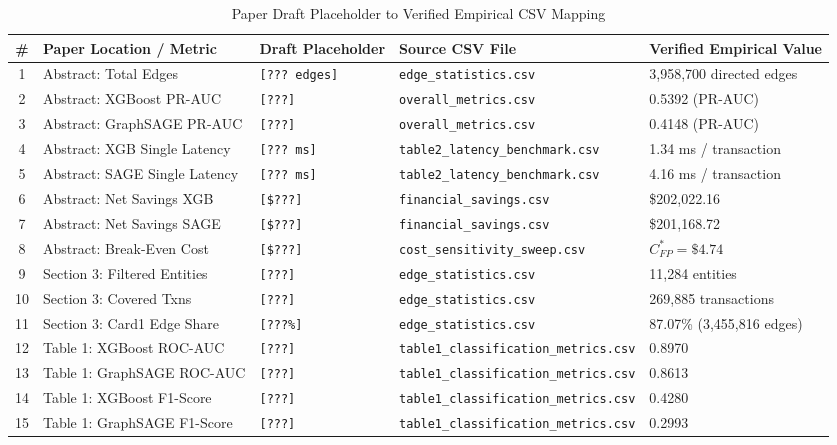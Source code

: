 \documentclass[11pt,a4paper]{report}
\begin{document}
\begin{table}[H]
\centering
\caption{Paper Draft Placeholder to Verified Empirical CSV Mapping}
\label{tab:placeholder_mapping}
\small
\begin{tabular}{cllll}
\toprule
\textbf{\#} & \textbf{Paper Location / Metric} & \textbf{Draft Placeholder} & \textbf{Source CSV File} & \textbf{Verified Empirical Value} \\
\midrule
1 & Abstract: Total Edges & \texttt{[??? edges]} & \texttt{edge\_statistics.csv} & 3,958,700 directed edges \\
2 & Abstract: XGBoost PR-AUC & \texttt{[???]} & \texttt{overall\_metrics.csv} & 0.5392 (PR-AUC) \\
3 & Abstract: GraphSAGE PR-AUC & \texttt{[???]} & \texttt{overall\_metrics.csv} & 0.4148 (PR-AUC) \\
4 & Abstract: XGB Single Latency & \texttt{[??? ms]} & \texttt{table2\_latency\_benchmark.csv} & 1.34 ms / transaction \\
5 & Abstract: SAGE Single Latency & \texttt{[??? ms]} & \texttt{table2\_latency\_benchmark.csv} & 4.16 ms / transaction \\
6 & Abstract: Net Savings XGB & \texttt{[\$???]} & \texttt{financial\_savings.csv} & \$202,022.16 \\
7 & Abstract: Net Savings SAGE & \texttt{[\$???]} & \texttt{financial\_savings.csv} & \$201,168.72 \\
8 & Abstract: Break-Even Cost & \texttt{[\$???]} & \texttt{cost\_sensitivity\_sweep.csv} & $C_{FP}^* = \$4.74$ \\
9 & Section 3: Filtered Entities & \texttt{[???]} & \texttt{edge\_statistics.csv} & 11,284 entities \\
10 & Section 3: Covered Txns & \texttt{[???]} & \texttt{edge\_statistics.csv} & 269,885 transactions \\
11 & Section 3: Card1 Edge Share & \texttt{[???\%]} & \texttt{edge\_statistics.csv} & 87.07\% (3,455,816 edges) \\
12 & Table 1: XGBoost ROC-AUC & \texttt{[???]} & \texttt{table1\_classification\_metrics.csv} & 0.8970 \\
13 & Table 1: GraphSAGE ROC-AUC & \texttt{[???]} & \texttt{table1\_classification\_metrics.csv} & 0.8613 \\
14 & Table 1: XGBoost F1-Score & \texttt{[???]} & \texttt{table1\_classification\_metrics.csv} & 0.4280 \\
15 & Table 1: GraphSAGE F1-Score & \texttt{[???]} & \texttt{table1\_classification\_metrics.csv} & 0.2993 \\

\end{tabular}
\end{table}
\end{document}
